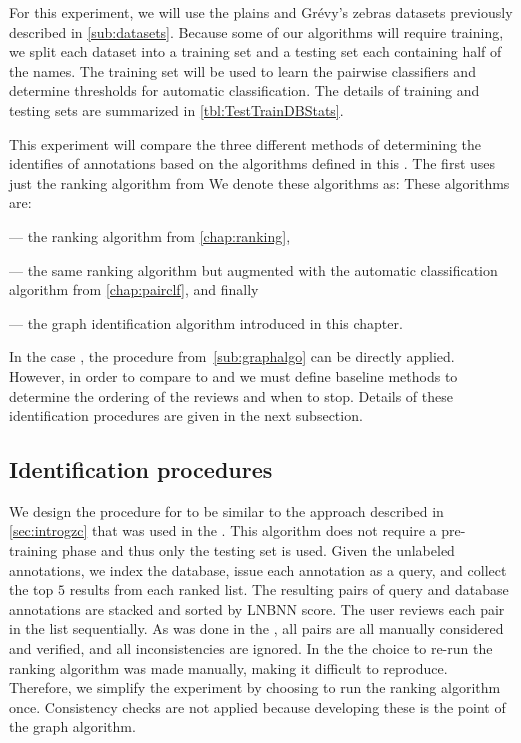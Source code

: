     For this experiment, we will use the plains and Grévy's zebras datasets previously described in
      \cref{sub:datasets}.
    Because some of our algorithms will require training, we split each dataset into a training set and a testing
      set each containing half of the names.
    The training set will be used to learn the pairwise classifiers and determine thresholds for automatic
      classification.
    The details of training and testing sets are summarized in \cref{tbl:TestTrainDBStats}.
    \TestTrainDBStats{}
    \FloatBarrier{}

    This experiment will compare the three different methods of determining the identifies of annotations based
      on the algorithms defined in this \thesis{}.
    The first uses just the ranking algorithm from We denote these algorithms as:
    These algorithms are:
    \begin{enumin}

    \item {} --- the ranking algorithm from \cref{chap:ranking}, 

    \item {} --- the same
        ranking algorithm but augmented with the automatic classification algorithm from \cref{chap:pairclf}, and
        finally

    \item {} --- the graph identification algorithm introduced in this chapter.

    \end{enumin}
    In the case , the procedure from~\cref{sub:graphalgo} can be directly applied.
    However, in order to compare  to  and  we must define baseline
      methods to determine the ordering of the reviews and when to stop.
    Details of these identification procedures are given in the next subsection.

    \FloatBarrier{}
    \subsection{Identification procedures}

    We design the procedure for  to be similar to the approach described in \cref{sec:introgzc}
      that was used in the \GZC{}.
    This algorithm does not require a pre-training phase and thus only the testing set is used.
    Given the unlabeled annotations, we index the database, issue each annotation as a query, and collect the top
      $5$ results from each ranked list.
    The resulting pairs of query and database annotations are stacked and sorted by LNBNN score.
    The user reviews each pair in the list sequentially.
    As was done in the \GZC{}, all pairs are all manually considered and verified, and all inconsistencies are
      ignored.
    In the \GZC{} the choice to re-run the ranking algorithm was made manually, making it difficult to reproduce.
    Therefore, we simplify the experiment by choosing to run the ranking algorithm once.
    Consistency checks are not applied because developing these is the point of the graph algorithm.

